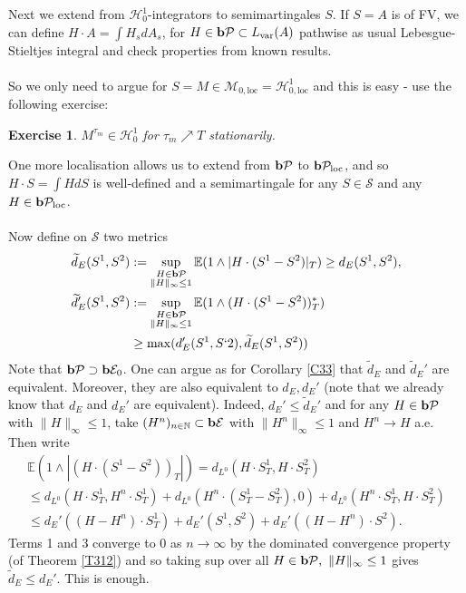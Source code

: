 \documentclass[12pt,a4paper, twoside]{article}
\newtheorem{exe}{Exercise}[section]
\theoremstyle{definition}
\newcommand{\EE}{\mathbb{E}} %
\newcommand{\simple}{\textbf{\text{b}}\mathcal{E}}
\newcommand{\pred}{\textbf{\text{b}}\mathcal{P}}
\begin{document}
Next we extend from $\mathcal{H}_0^1$-integrators to semimartingales $S$. If $S=A$ is of FV, we can define $H \cdot A = \int H_s dA_s$, for $H \in \pred \subset L_{\text{var}}(A)$ pathwise as usual Lebesgue-Stieltjes integral and check properties from known results. \\
\\
So we only need to argue for $S= M \in \mathcal{M}_{0, \text{loc}} = \mathcal{H}_{0, \text{loc}}^1$ and this is easy - use the following exercise: 
\begin{exe} $M^{\tau_m} \in \mathcal{H}_0^1$ for $\tau_m \nearrow T$ stationarily.
\end{exe}
One more localisation allows us to extend from $\pred$ to $\pred_\text{loc}$, and so $H \cdot S = \int H dS$ is well-defined and a semimartingale for any $S \in \mathcal{S}$ and any $H \in \pred_\text{loc}$.\\
\\
Now define on $\mathcal{S}$ two metrics 
\begin{align*}
\widetilde{d}_E(S^1,S^2)&:= \sup_{\substack{H \in \pred \\ \|H\|_\infty \leq 1}} \EE(1 \wedge |H \cdot (S^1-S^2)|_T) \geq d_E(S^1,S^2), \\
\widetilde{d}_E' (S^1,S^2)& := \sup_{ \substack{H \in \pred \\ \|H\|_\infty \leq1 }} \EE(1 \wedge (H \cdot (S^1-S^2))_T^*) \\
& \geq \max( d_E'(S^1,S`2), \widetilde{d}_E(S^1,S^2))
\end{align*}
Note that $\pred \supset \simple_0$. \newpage
One can argue as for Corollary \ref{C33} that $\widetilde{d}_E$ and $\widetilde{d}_E'$ are equivalent. Moreover, they are also equivalent to $d_E, d_E'$ (note that we already know that $d_E$ and $d_E'$ are equivalent). Indeed, $d_E' \leq \widetilde{d}_E'$ and for any $H \in \pred$ with $\|H\|_\infty \leq 1$, take $(H^n)_{n \in \mathbb{N}} \subset \simple$ with $\|H^n\|_\infty \leq 1$ and $H^n \to H$ a.e. Then write
\begin{align*}
\EE(1 \wedge | ( H \cdot (S^1-S^2))_T|) = d_{L^0} (H \cdot S_T^1, H \cdot S_T^2) \\
\leq d_{L^0} ( H \cdot S_T^1, H^n \cdot S_T^1) + d_{L^0} ( H^n \cdot (S_T^1-S_T^2) , 0) + d_{L^0} ( H^n \cdot S_T^1, H \cdot S_T^2) \\
 \leq d_E'((H-H^n) \cdot S_T^1) + d_E'( S^1, S^2) + d_E'( (H- H^n) \cdot S^2).
\end{align*}
Terms 1 and 3 converge to $0$ as $n \to \infty$ by the dominated convergence property (of Theorem \ref{T312}) and so taking sup over all $H \in \pred, \ \|H\|_\infty \leq 1$ gives $\widetilde{d}_E \leq d_E'$. This is enough. 
\end{document}
